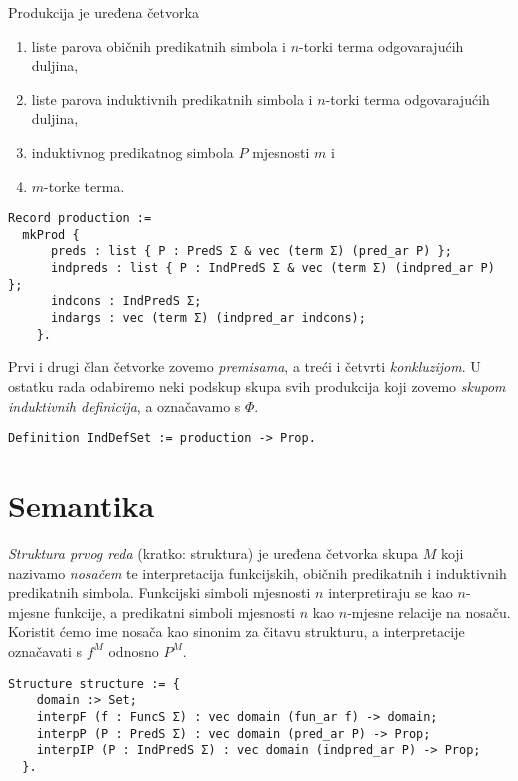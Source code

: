 \begin{definition}
  Produkcija je uređena četvorka
  \begin{enumerate}
  \item liste parova običnih predikatnih simbola i \(n\)-torki terma odgovarajućih duljina,
  \item liste parova induktivnih predikatnih simbola i \(n\)-torki terma odgovarajućih duljina,
  \item induktivnog predikatnog simbola \(P\) mjesnosti \(m\) i
  \item \(m\)-torke terma.
  \end{enumerate}
\begin{verbatim}
Record production :=
  mkProd {
      preds : list { P : PredS Σ & vec (term Σ) (pred_ar P) };
      indpreds : list { P : IndPredS Σ & vec (term Σ) (indpred_ar P) };
      indcons : IndPredS Σ;
      indargs : vec (term Σ) (indpred_ar indcons);
    }.
\end{verbatim}
  Prvi i drugi član četvorke zovemo \textit{premisama}, a treći i četvrti \textit{konkluzijom}.
  U ostatku rada odabiremo neki podskup skupa svih produkcija koji zovemo
  \textit{skupom induktivnih definicija}, a označavamo s \(\Phi\).
\begin{verbatim}
Definition IndDefSet := production -> Prop.
\end{verbatim}
\end{definition}


\section{Semantika}\label{sec:semantika}
\begin{definition}
  \textit{Struktura prvog reda} (kratko: struktura) je uređena četvorka skupa \(M\) koji nazivamo \textit{nosačem}
  te interpretacija funkcijskih, običnih predikatnih i induktivnih predikatnih simbola.
  Funkcijski simboli mjesnosti \(n\) interpretiraju se kao \(n\)-mjesne funkcije, a predikatni simboli mjesnosti \(n\) kao \(n\)-mjesne relacije na nosaču.
  Koristit ćemo ime nosača kao sinonim za čitavu strukturu,
  a interpretacije označavati s \(f^{M}\) odnosno \(P^{M}\).
\begin{verbatim}
Structure structure := {
    domain :> Set;
    interpF (f : FuncS Σ) : vec domain (fun_ar f) -> domain;
    interpP (P : PredS Σ) : vec domain (pred_ar P) -> Prop;
    interpIP (P : IndPredS Σ) : vec domain (indpred_ar P) -> Prop;
  }.
\end{verbatim}
\end{definition}

